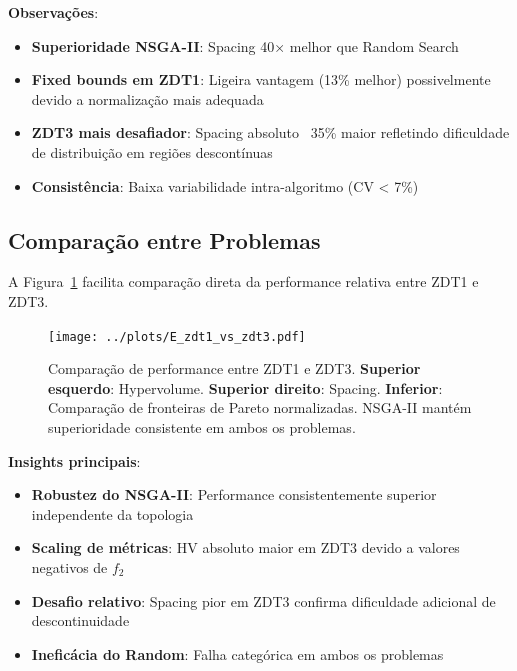 \textbf{Observações}:
\begin{itemize}
    \item \textbf{Superioridade NSGA-II}: Spacing 40× melhor que Random Search
    \item \textbf{Fixed bounds em ZDT1}: Ligeira vantagem (13\% melhor) possivelmente devido a normalização mais adequada
    \item \textbf{ZDT3 mais desafiador}: Spacing absoluto ~35\% maior refletindo dificuldade de distribuição em regiões descontínuas
    \item \textbf{Consistência}: Baixa variabilidade intra-algoritmo (CV < 7\%)
\end{itemize}

\subsection{Comparação entre Problemas}

A Figura~\ref{fig:zdt_comparison} facilita comparação direta da performance relativa entre ZDT1 e ZDT3.

\begin{figure}[H]
    \centering
    \texttt{[image: ../plots/E\_zdt1\_vs\_zdt3.pdf]}
    \caption{Comparação de performance entre ZDT1 e ZDT3. \textbf{Superior esquerdo}: Hypervolume. \textbf{Superior direito}: Spacing. \textbf{Inferior}: Comparação de fronteiras de Pareto normalizadas. NSGA-II mantém superioridade consistente em ambos os problemas.}
    \label{fig:zdt_comparison}
\end{figure}

\textbf{Insights principais}:
\begin{itemize}
    \item \textbf{Robustez do NSGA-II}: Performance consistentemente superior independente da topologia
    \item \textbf{Scaling de métricas}: HV absoluto maior em ZDT3 devido a valores negativos de $f_2$
    \item \textbf{Desafio relativo}: Spacing pior em ZDT3 confirma dificuldade adicional de descontinuidade
    \item \textbf{Ineficácia do Random}: Falha categórica em ambos os problemas
\end{itemize}


